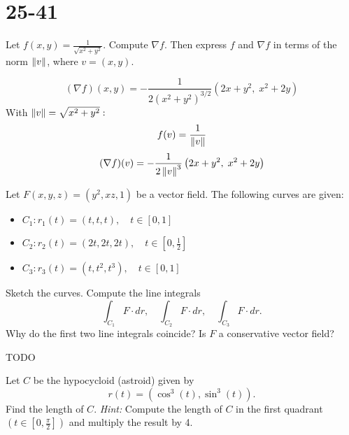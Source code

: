 \section{25-41}

\begin{exercise}
	Let $ f(x,y) = \frac{1}{\sqrt{x^2 + y^2}} $. Compute $\nabla f$. Then express $f$ and $\nabla f$ in terms of the norm $\left\lVert v \right\rVert$, where $ v = (x,y) $.
\end{exercise}

\begin{solution}
	$$
		(\nabla f)(x,y) = -\frac{1}{2(x^2 + y^2)^{3/2}} \left( 2x+y^2, \; x^2+2y \right)
	$$
	With $ \left\lVert v \right\rVert = \sqrt{x^2 + y^2}:$
	$$
		f(v) = \frac{1}{\left\lVert v \right\rVert}
	$$
	$$
		(\nabla f)(v) = -\frac{1}{2 \left\lVert v \right\rVert^3} \left( 2x+y^2, \; x^2+2y \right)
	$$
\end{solution}

\begin{exercise}
	Let $ F(x,y,z) = (y^2, xz, 1) $ be a vector field. The following curves are given:
	\begin{itemize}
		\item $ C_1: r_1(t) = (t, t, t), \quad t \in [0,1] $
		\item $ C_2: r_2(t) = (2t, 2t, 2t), \quad t \in [0, \frac{1}{2}] $
		\item $ C_3: r_3(t) = (t, t^2, t^3), \quad t \in [0,1] $
	\end{itemize}
	Sketch the curves. Compute the line integrals
	$$
		\int_{C_1} F \cdot dr, \quad \int_{C_2} F \cdot dr, \quad \int_{C_3} F \cdot dr.
	$$
	Why do the first two line integrals coincide? Is $F$ a conservative vector field?
\end{exercise}

\begin{solution}
	TODO
\end{solution}

\begin{exercise}
	Let $C$ be the hypocycloid (astroid) given by
	$$
		r(t) = (\cos^3(t), \sin^3(t)).
	$$
	Find the length of $C$.
	\emph{Hint:} Compute the length of $C$ in the first quadrant $(t \in [0, \frac{\pi}{2}])$ and multiply the result by 4.
\end{exercise}

